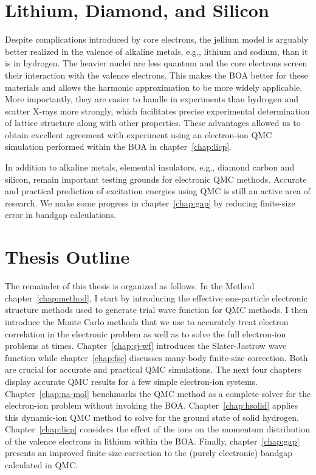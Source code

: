 
\section{Lithium, Diamond, and Silicon}
Despite complications introduced by core electrons, the jellium model is arguably better realized in the valence of alkaline metals, e.g., lithium and sodium, than it is in hydrogen.
The heavier nuclei are less quantum and the core electrons screen their interaction with the valence electrons.
This makes the BOA better for these materials and allows the harmonic approximation to be more widely applicable.
More importantly, they are easier to handle in experiments than hydrogen and scatter X-rays more strongly, which facilitates precise experimental determination of lattice structure along with other properties.
These advantages allowed us to obtain excellent agreement with experiment using an electron-ion QMC simulation performed within the BOA in chapter~\ref{chap:licp}.

In addition to alkaline metals, elemental insulators, e.g., diamond carbon and silicon, remain important testing grounds for electronic QMC methods. Accurate and practical prediction of excitation energies using QMC is still an active area of research. We make some progress in chapter~\ref{chap:gap} by reducing finite-size error in bandgap calculations.

\section{Thesis Outline}
The remainder of this thesis is organized as follows. In the Method chapter~\ref{chap:method}, I start by introducing the effective one-particle electronic structure methods used to generate trial wave function for QMC methods.
I then introduce the Monte Carlo methods that we use to accurately treat electron correlation in the electronic problem as well as to solve the full electron-ion problems at times.
Chapter~\ref{chap:sj-wf} introduces the Slater-Jastrow wave function while chapter~\ref{chap:fsc} discusses many-body finite-size correction.
Both are crucial for accurate and practical QMC simulations.
The next four chapters display accurate QMC results for a few simple electron-ion systems.
Chapter~\ref{chap:na-mol} benchmarks the QMC method as a complete solver for the electron-ion problem without invoking the BOA.
Chapter~\ref{chap:hsolid} applies this dynamic-ion QMC method to solve for the ground state of solid hydrogen.
Chapter~\ref{chap:licp} considers the effect of the ions on the momentum distribution of the valence electrons in lithium within the BOA.
Finally, chapter~\ref{chap:gap} presents an improved finite-size correction to the (purely electronic) bandgap calculated in QMC.